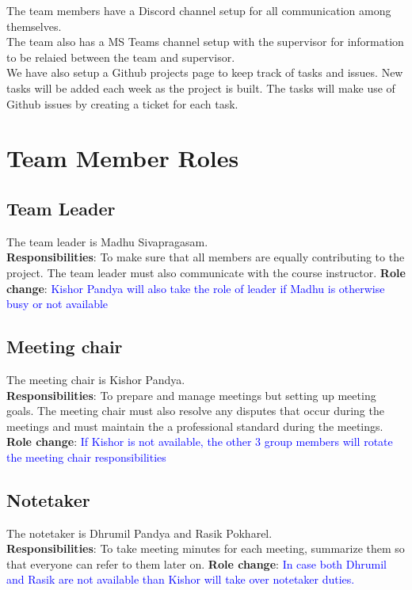 \documentclass{article}
\begin{document}
The team members have a Discord channel setup for all communication among themselves.\\
The team also has a MS Teams channel setup with the supervisor for information to be relaied between the team and supervisor.\\
We have also setup a Github projects page to keep track of tasks and issues. New tasks will be added each week as the project is built. The tasks will make use of Github issues by creating a ticket for each task.\\

\section{Team Member Roles}

\subsection{Team Leader}
The team leader is Madhu Sivapragasam.\\
\textbf{Responsibilities}: To make sure that all members are equally contributing to the project. The team leader must also communicate with the course instructor.
\textbf{Role change}: \textcolor{blue}{Kishor Pandya will also take the role of leader if Madhu is otherwise busy or not available}

\subsection{Meeting chair}
The meeting chair is Kishor Pandya.\\
\textbf{Responsibilities}: To prepare and manage meetings but setting up meeting goals. The meeting chair must also resolve any disputes that occur during the meetings and must maintain the a professional standard during the meetings.
\textbf{Role change}: \textcolor{blue}{If Kishor is not available, the other 3 group members will rotate the meeting chair responsibilities}

\subsection{Notetaker}
The notetaker is Dhrumil Pandya and Rasik Pokharel.\\
\textbf{Responsibilities}: To take meeting minutes for each meeting, summarize them so that everyone can refer to them later on.
\textbf{Role change}: \textcolor{blue}{In case both Dhrumil and Rasik are not available than Kishor will take over notetaker duties.}
\end{document}
